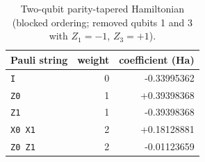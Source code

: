 \begin{table}[H]
\centering\small
\begin{tabular}{lrr}
\toprule
Pauli string & weight & coefficient (Ha) \\
\midrule
\texttt{I} & 0 & -0.33995362 \\
\texttt{Z0} & 1 & +0.39398368 \\
\texttt{Z1} & 1 & -0.39398368 \\
\texttt{X0\,X1} & 2 & +0.18128881 \\
\texttt{Z0\,Z1} & 2 & -0.01123659 \\
\bottomrule
\end{tabular}
\caption{Two-qubit parity-tapered Hamiltonian (blocked ordering; removed qubits 1 and 3 with $Z_1=-1$, $Z_3=+1$).}
\end{table}
